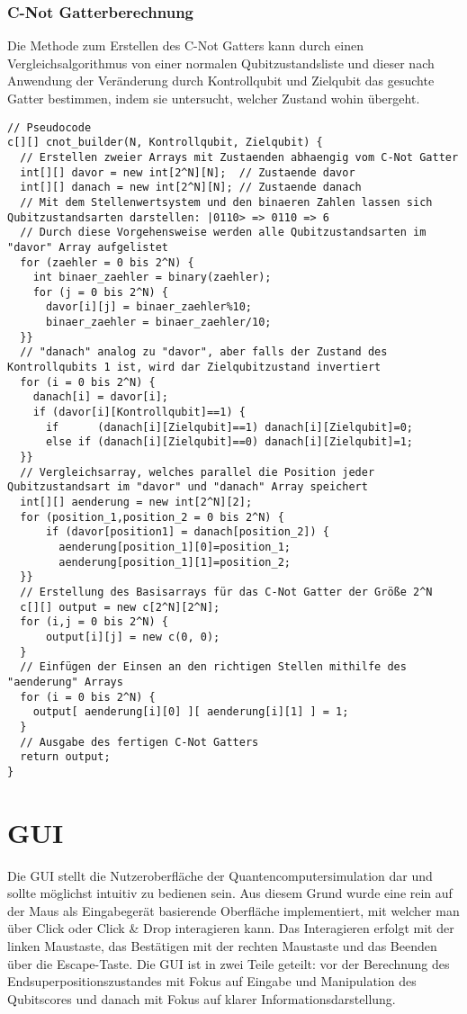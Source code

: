 \documentclass[12pt]{report}
\begin{document}
\subsubsection{C-Not Gatterberechnung}
Die Methode zum Erstellen des C-Not Gatters kann durch einen Vergleichsalgorithmus von einer normalen Qubitzustandsliste und dieser nach Anwendung der Veränderung durch Kontrollqubit und Zielqubit das gesuchte Gatter bestimmen, indem sie untersucht, welcher Zustand wohin übergeht.
\lstset{escapechar=@,style=customcsmall}
\begin{lstlisting}
// Pseudocode
c[][] cnot_builder(N, Kontrollqubit, Zielqubit) {
  // Erstellen zweier Arrays mit Zustaenden abhaengig vom C-Not Gatter
  int[][] davor = new int[2^N][N]; 	// Zustaende davor
  int[][] danach = new int[2^N][N];	// Zustaende danach
  // Mit dem Stellenwertsystem und den binaeren Zahlen lassen sich Qubitzustandsarten darstellen: |0110> => 0110 => 6
  // Durch diese Vorgehensweise werden alle Qubitzustandsarten im "davor" Array aufgelistet
  for (zaehler = 0 bis 2^N) {
    int binaer_zaehler = binary(zaehler);   
    for (j = 0 bis 2^N) {
      davor[i][j] = binaer_zaehler%10;
      binaer_zaehler = binaer_zaehler/10;
  }}
  // "danach" analog zu "davor", aber falls der Zustand des Kontrollqubits 1 ist, wird dar Zielqubitzustand invertiert
  for (i = 0 bis 2^N) {
    danach[i] = davor[i];
    if (davor[i][Kontrollqubit]==1) {
      if      (danach[i][Zielqubit]==1) danach[i][Zielqubit]=0;
      else if (danach[i][Zielqubit]==0) danach[i][Zielqubit]=1;
  }}
  // Vergleichsarray, welches parallel die Position jeder Qubitzustandsart im "davor" und "danach" Array speichert
  int[][] aenderung = new int[2^N][2]; 
  for (position_1,position_2 = 0 bis 2^N) {
      if (davor[position1] = danach[position_2]) {
        aenderung[position_1][0]=position_1; 
        aenderung[position_1][1]=position_2;
  }}
  // Erstellung des Basisarrays für das C-Not Gatter der Größe 2^N
  c[][] output = new c[2^N][2^N];
  for (i,j = 0 bis 2^N) {
      output[i][j] = new c(0, 0);
  }
  // Einfügen der Einsen an den richtigen Stellen mithilfe des "aenderung" Arrays
  for (i = 0 bis 2^N) {
    output[ aenderung[i][0] ][ aenderung[i][1] ] = 1;
  }
  // Ausgabe des fertigen C-Not Gatters
  return output;
}
\end{lstlisting}

\section{GUI}
Die GUI stellt die Nutzeroberfläche der Quantencomputersimulation dar und sollte möglichst intuitiv zu bedienen sein. Aus diesem Grund wurde eine rein auf der Maus als Eingabegerät basierende Oberfläche implementiert, mit welcher man über Click oder Click \& Drop interagieren kann. Das Interagieren erfolgt mit der linken Maustaste, das Bestätigen mit der rechten Maustaste und das Beenden über die Escape-Taste. Die GUI ist in zwei Teile geteilt: vor der Berechnung des Endsuperpositionszustandes mit Fokus auf Eingabe und Manipulation des Qubitscores und danach mit Fokus auf klarer Informationsdarstellung.
\end{document}
